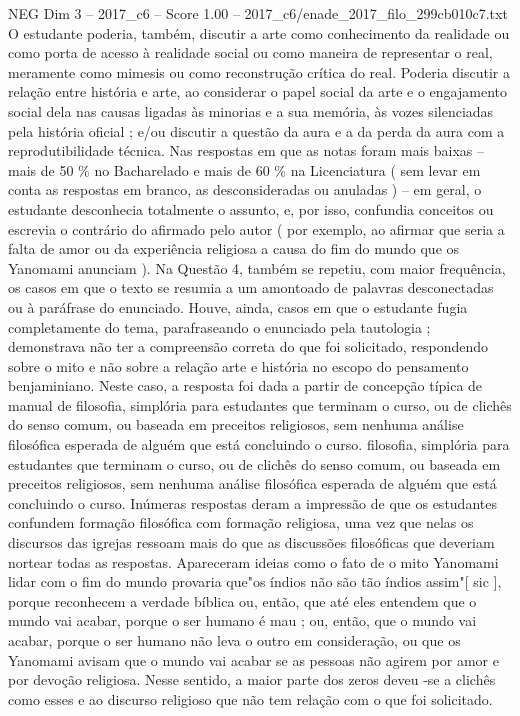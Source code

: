 \begin{textsample}{NEG Dim 3 – 2017\_c6 – Score 1.00 – 2017\_c6/enade\_2017\_filo\_299cb010c7.txt}
O estudante poderia, também, discutir a arte como conhecimento da realidade ou como porta de acesso à realidade social ou como maneira de representar o real, meramente como mimesis ou como reconstrução crítica do real.
Poderia discutir a relação entre história e arte, ao considerar o papel social da arte e o engajamento social dela nas causas ligadas às minorias e a sua memória, às vozes silenciadas pela história oficial ; e/ou discutir a questão da aura e a da perda da aura com a reprodutibilidade técnica.
Nas respostas em que as notas foram mais baixas – mais de 50 \% no Bacharelado e mais de 60 \% na Licenciatura ( sem levar em conta as respostas em branco, as desconsideradas ou anuladas ) – em geral, o estudante desconhecia totalmente o assunto, e, por isso, confundia conceitos ou escrevia o contrário do afirmado pelo autor ( por exemplo, ao afirmar que seria a falta de amor ou da experiência religiosa a causa do fim do mundo que os Yanomami anunciam ).
Na Questão 4, também se repetiu, com maior frequência, os casos em que o texto se resumia a um amontoado de palavras desconectadas ou à paráfrase do enunciado.
Houve, ainda, casos em que o estudante fugia completamente do tema, parafraseando o enunciado pela tautologia ; demonstrava não ter a compreensão correta do que foi solicitado, respondendo sobre o mito e não sobre a relação arte e história no escopo do pensamento benjaminiano.
Neste caso, a resposta foi dada a partir de concepção típica de manual de filosofia, simplória para estudantes que terminam o curso, ou de clichês do senso comum, ou baseada em preceitos religiosos, sem nenhuma análise filosófica esperada de alguém que está concluindo o curso. filosofia, simplória para estudantes que terminam o curso, ou de clichês do senso comum, ou baseada em preceitos religiosos, sem nenhuma análise filosófica esperada de alguém que está concluindo o curso.
Inúmeras respostas deram a impressão de que os estudantes confundem formação filosófica com formação religiosa, uma vez que nelas os discursos das igrejas ressoam mais do que as discussões filosóficas que deveriam nortear todas as respostas.
Apareceram ideias como o fato de o mito Yanomami lidar com o fim do mundo provaria que"os índios não são tão índios assim"[ sic ], porque reconhecem a verdade bíblica ou, então, que até eles entendem que o mundo vai acabar, porque o ser humano é mau ; ou, então, que o mundo vai acabar, porque o ser humano não leva o outro em consideração, ou que os Yanomami avisam que o mundo vai acabar se as pessoas não agirem por amor e por devoção religiosa.
Nesse sentido, a maior parte dos zeros deveu -se a clichês como esses e ao discurso religioso que não tem relação com o que foi solicitado.

\end{textsample}
